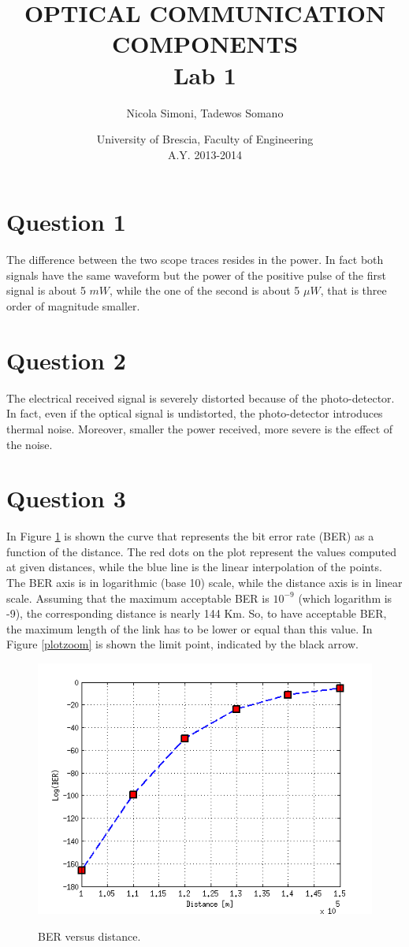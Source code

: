 \documentclass[a4paper,10pt]{report}
\title{\textbf{OPTICAL COMMUNICATION COMPONENTS \\ Lab 1}}
\author{Nicola Simoni, Tadewos Somano}
\date{University of Brescia, Faculty of Engineering\\A.Y. 2013-2014}
\begin{document}
\maketitle


\section*{Question 1}
The difference between the two scope traces resides in the power. In fact both signals have the same waveform but
the power of the positive pulse of the first signal is about 5 $mW$, while the one of the second is about 5 $\mu W$, that is three order
of magnitude smaller.

\section*{Question 2}
The electrical received signal is severely distorted because of the photo-detector. In fact, even if the optical signal is undistorted, the
photo-detector introduces thermal noise. Moreover, smaller the power received, more severe is the effect of the noise.

\section*{Question 3}
In Figure \ref{plot} is shown the curve that represents the bit error rate (BER) as a function of the distance.
The red dots on the plot represent the values computed at given distances, while the blue line is the linear interpolation of the points.
The BER axis is in logarithmic (base 10) scale, while the distance axis is in linear scale.
Assuming that the maximum acceptable BER is $10^{-9}$ (which logarithm is -9), the corresponding distance
is nearly 144 Km. So, to have acceptable BER, the maximum length of the link has to be lower or equal than this value.
In Figure \ref{plotzoom} is shown the limit point, indicated by the black arrow.

\begin{figure}[!h]
  \centering
  \includegraphics[width=12cm]{plot.png}\\
  \caption{BER versus distance.}
  \label{plot}
\end{figure}
\end{document}
